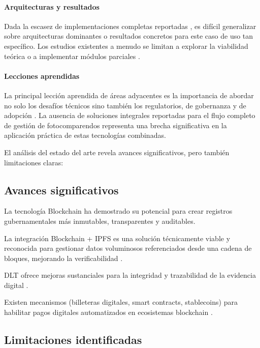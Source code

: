\paragraph{Arquitecturas y resultados} Dada la escasez de implementaciones completas reportadas \parencite{AnandSingh_ProjectReport_Year,juit2024traffic}, es difícil generalizar sobre arquitecturas dominantes o resultados concretos para este caso de uso tan específico. Los estudios existentes a menudo se limitan a explorar la viabilidad teórica o a implementar módulos parciales \parencite{choquevilca2024blockchain}.

\paragraph{Lecciones aprendidas} La principal lección aprendida de áreas adyacentes es la importancia de abordar no solo los desafíos técnicos \parencite{zheng2018blockchain} sino también los regulatorios, de gobernanza y de adopción \parencite{tan2022blockchain}. La ausencia de soluciones integrales reportadas para el flujo completo de gestión de fotocomparendos representa una brecha significativa en la aplicación práctica de estas tecnologías combinadas.

El análisis del estado del arte revela avances significativos, pero también limitaciones claras: 
  

\subsection{Avances significativos} 

La tecnología Blockchain ha demostrado su potencial para crear registros gubernamentales más inmutables, transparentes y auditables. \parencite{balcerzak2022blockchain,meroni2023editorial} 

La integración Blockchain + IPFS es una solución técnicamente viable y reconocida para gestionar datos voluminosos referenciados desde una cadena de bloques, mejorando la verificabilidad \parencite{adel2023decentralized,mishra2024integration}. 

DLT ofrece mejoras sustanciales para la integridad y trazabilidad de la evidencia digital \parencite{thanasas2025enhancing}. 

Existen mecanismos (billeteras digitales, smart contracts, stablecoins) para habilitar pagos digitales automatizados en ecosistemas blockchain \parencite{antonopoulos2023mastering}.

\subsection{Limitaciones identificadas} 

